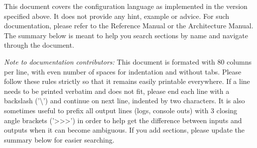 \maketitle
\tableofcontents
\newpage

This document covers the configuration language as implemented in the version
specified above. It does not provide any hint, example or advice. For such
documentation, please refer to the Reference Manual or the Architecture Manual.
The summary below is meant to help you search sections by name and navigate
through the document.

\emph{Note to documentation contributors:}
This document is formated with 80 columns per line, with even number of
spaces for indentation and without tabs. Please follow these rules strictly
so that it remains easily printable everywhere. If a line needs to be
printed verbatim and does not fit, please end each line with a backslash
('\textbackslash') and continue on next line, indented by two characters. It is also
sometimes useful to prefix all output lines (logs, console outs) with 3
closing angle brackets ('\textgreater{}\textgreater{}\textgreater{}') in order to help get the difference between
inputs and outputs when it can become ambiguous. If you add sections,
please update the summary below for easier searching.